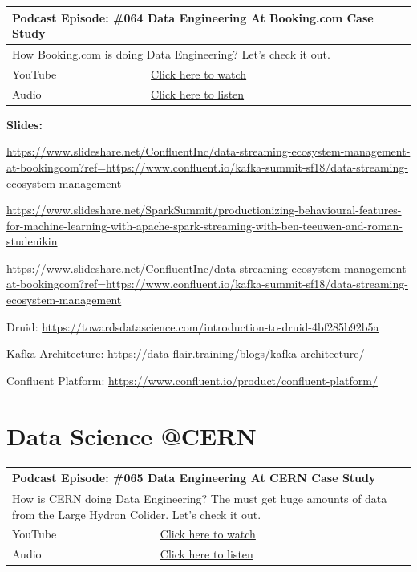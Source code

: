 \documentclass[12pt, numbers=noenddot]{scrreprt} %
\begin{document}
\begin{table}[h]
\begin{tabular}{ll}
\hline
\multicolumn{2}{l}{\textbf{Podcast Episode:} \#064 Data Engineering At Booking.com Case Study} \\ \hline
\multicolumn{2}{p{15cm}}{How Booking.com is doing Data Engineering? Let's check it out.}         \\ \hline
\multicolumn{1}{l|}{YouTube}   & \href{https://youtu.be/9GE3yiVo1FM}{Click here to watch}   \\ 
\multicolumn{1}{l|}{Audio}     & \href{https://anchor.fm/andreaskayy/episodes/064-Data-Engineering-At-Booking-com-Case-Study-e45ilg}{Click here to listen}   \\ \hline
\end{tabular}
\end{table}

\textbf{Slides:}

\url{https://www.slideshare.net/ConfluentInc/data-streaming-ecosystem-management-at-bookingcom?ref=https://www.confluent.io/kafka-summit-sf18/data-streaming-ecosystem-management}

\url{https://www.slideshare.net/SparkSummit/productionizing-behavioural-features-for-machine-learning-with-apache-spark-streaming-with-ben-teeuwen-and-roman-studenikin}

\url{https://www.slideshare.net/ConfluentInc/data-streaming-ecosystem-management-at-bookingcom?ref=https://www.confluent.io/kafka-summit-sf18/data-streaming-ecosystem-management}

Druid:
\url{https://towardsdatascience.com/introduction-to-druid-4bf285b92b5a}

Kafka Architecture:
\url{https://data-flair.training/blogs/kafka-architecture/}

Confluent Platform:
\url{https://www.confluent.io/product/confluent-platform/}


\section{Data Science @CERN}

\begin{table}[h]
\begin{tabular}{ll}
\hline
\multicolumn{2}{l}{\textbf{Podcast Episode:} \#065 Data Engineering At CERN Case Study} \\ \hline
\multicolumn{2}{p{15cm}}{How is CERN doing Data Engineering? The must get huge amounts of data from the Large Hydron Colider. Let's check it out.}         \\ \hline
\multicolumn{1}{l|}{YouTube}   & \href{https://youtu.be/LrhfzPsKaDE}{Click here to watch}   \\ 
\multicolumn{1}{l|}{Audio}     & \href{https://anchor.fm/andreaskayy/episodes/065-Data-Engineering-At-CERN-Case-Study-e45ime}{Click here to listen}   \\ \hline
\end{tabular}
\end{table}
\end{document}
